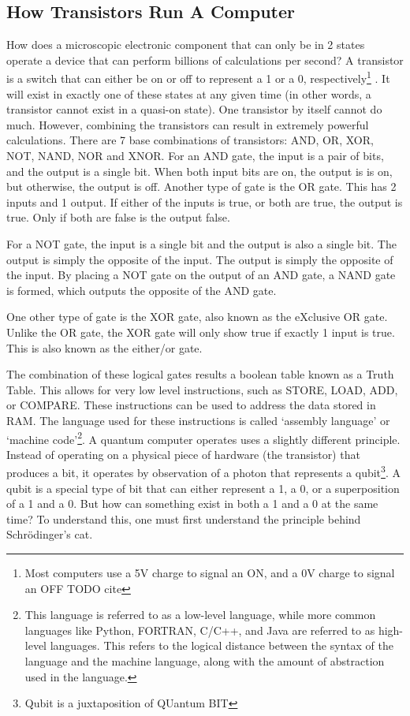 \documentclass[10pt,journal,compsoc]{IEEEtran}
\begin{document}
\subsection{How Transistors Run A Computer}
How does a microscopic electronic component that can only be in 2 states operate a device that can perform billions of calculations per second? A transistor is a switch that can either be on or off to represent a 1 or a 0, respectively\footnote{Most computers use a 5V charge to signal an ON, and a 0V charge to signal an OFF TODO cite
	}
. It will exist in exactly one of these states at any given time (in other words, a transistor cannot exist in a quasi-on state). One transistor by itself cannot do much. However, combining the transistors can result in extremely powerful calculations. There are 7 base combinations of transistors: AND, OR, XOR, NOT, NAND, NOR and XNOR.  For an AND gate, the input is a pair of bits, and the output is a single bit. When both input bits are on, the output is is on, but otherwise, the output is off. Another type of gate is the OR gate. This has 2 inputs and 1 output. If either of the inputs is true, or both are true, the output is true. Only if both are false is the output false. 

For a NOT gate, the input is a single bit and the output is also a single bit. The output is simply the opposite of the input. The output is simply the opposite of the input. By placing a NOT gate on the output of an AND gate, a NAND gate is formed, which outputs the opposite of the AND gate. 

One other type of gate is the XOR gate, also known as the eXclusive OR gate. Unlike the OR gate, the XOR gate will only show true if exactly 1 input is true. This is also known as the either/or gate.


The combination of these logical gates results a boolean table known as a Truth Table. This allows for very low level instructions, such as STORE, LOAD, ADD, or COMPARE.
These instructions can be used to address the data stored in RAM. The language used for these instructions is called `assembly language' or `machine code'\footnote{This language is referred to as a low-level language, while more common languages like Python, FORTRAN, C/C++, and Java are referred to as high-level languages. This refers to the logical distance between the syntax of the language and the machine language, along with the amount of abstraction used in the language.}.
A quantum computer operates uses a slightly different principle. Instead of operating on a physical piece of hardware (the transistor) that produces a bit, it operates by observation of a photon that represents a qubit\footnote{Qubit is a juxtaposition of QUantum BIT}. A qubit is a special type of bit that can either represent a 1, a 0, or a superposition of a 1 and a 0. But how can something exist in both a 1 and a 0 at the same time? To understand this, one must first understand the principle behind Schr\"{o}dinger’s cat. 
\end{document}
